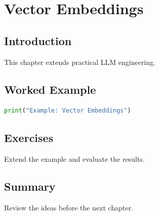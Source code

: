 \chapter{Vector Embeddings}
\label{chap:vol9-12}



\section{Introduction}
This chapter extends practical LLM engineering.

\section{Worked Example}
\begin{lstlisting}[language=Python]
print("Example: Vector Embeddings")
\end{lstlisting}

\section{Exercises}
\begin{exercise}
Extend the example and evaluate the results.
\end{exercise}

\section{Summary}
Review the ideas before the next chapter.
